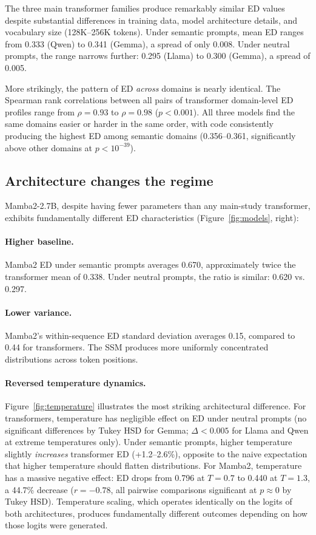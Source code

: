 \documentclass{article}
\begin{document}
The three main transformer families produce remarkably similar ED values despite substantial differences in training data, model architecture details, and vocabulary size (128K--256K tokens). Under semantic prompts, mean ED ranges from 0.333 (Qwen) to 0.341 (Gemma), a spread of only 0.008. Under neutral prompts, the range narrows further: 0.295 (Llama) to 0.300 (Gemma), a spread of 0.005.

More strikingly, the pattern of ED \emph{across} domains is nearly identical. The Spearman rank correlations between all pairs of transformer domain-level ED profiles range from $\rho = 0.93$ to $\rho = 0.98$ ($p < 0.001$). All three models find the same domains easier or harder in the same order, with code consistently producing the highest ED among semantic domains (0.356--0.361, significantly above other domains at $p < 10^{-39}$).

\subsection{Architecture changes the regime}
\label{sec:architecture}

Mamba2-2.7B, despite having fewer parameters than any main-study transformer, exhibits fundamentally different ED characteristics (Figure~\ref{fig:models}, right):

\paragraph{Higher baseline.} Mamba2 ED under semantic prompts averages 0.670, approximately twice the transformer mean of 0.338. Under neutral prompts, the ratio is similar: 0.620 vs. 0.297.

\paragraph{Lower variance.} Mamba2's within-sequence ED standard deviation averages 0.15, compared to 0.44 for transformers. The SSM produces more uniformly concentrated distributions across token positions.

\paragraph{Reversed temperature dynamics.}
Figure~\ref{fig:temperature} illustrates the most striking architectural difference. For transformers, temperature has negligible effect on ED under neutral prompts (no significant differences by Tukey HSD for Gemma; $\Delta < 0.005$ for Llama and Qwen at extreme temperatures only). Under semantic prompts, higher temperature slightly \emph{increases} transformer ED (+1.2--2.6\%), opposite to the naive expectation that higher temperature should flatten distributions. For Mamba2, temperature has a massive negative effect: ED drops from 0.796 at $T = 0.7$ to 0.440 at $T = 1.3$, a 44.7\% decrease ($r = -0.78$, all pairwise comparisons significant at $p \approx 0$ by Tukey HSD). Temperature scaling, which operates identically on the logits of both architectures, produces fundamentally different outcomes depending on how those logits were generated.
\end{document}
